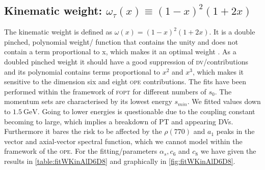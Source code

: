 \documentclass[../../index.tex]{subfiles}
\begin{document}
\subsection{Kinematic weight: $\omega_{\tau}(x) \equiv (1-x)^2(1+2x)$}
The kinematic weight is defined as $\omega(x) = (1-x)^2(1+2x)$. It is a
double pinched, polynomial weight\-/ function that contains the unity and
does not contain a term proportional to x, which makes it an optimal weight
\cite{Beneke2012}. As a doubled pinched weight it should have a good suppression
of \textsc{dv}\-/contributions and its polynomial contains terms proportional to
$x^2$ and $x^3$, which makes it sensitive to the dimension six and eight \textsc{ope}
contributions. The fits have been performed within the framework of \textsc{fopt} for different numbers of $s_0$.
The momentum sets are characterised by its lowest energy $s_{min}$. We
fitted values down to $\SI{1.5}{\giga\eV}$. Going to lower energies is
questionable due to the coupling constant becoming to large, which implies a
breakdown of \textsc{PT} and appearing DVs. Furthermore it bares the
risk to be affected by the $\rho(770)$ and $a_1$ peaks in the vector and
axial-vector spectral function, which we cannot model within the framework of
the \textsc{ope}. For the fitting\-/parameters $\alpha_s, c_6$ and $c_8$ we have given the results in
\cref{table:fitWKinAlD6D8} and graphically in \cref{fig:fitWKinAlD6D8}.
\end{document}
